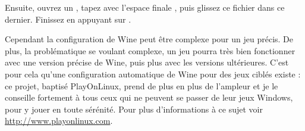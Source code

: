 Ensuite, ouvrez un , tapez avec l'espace finale , puis glissez ce fichier dans ce dernier. Finissez en appuyant sur .\par
\begin{nota}
Cependant la configuration de Wine peut être complexe pour un jeu précis. De plus, la problématique se voulant complexe, un jeu pourra très bien fonctionner avec une version précise de Wine, puis plus avec les versions ultérieures. C'est pour cela qu'une configuration automatique de Wine pour des jeux ciblés existe : ce projet, baptisé PlayOnLinux, prend de plus en plus de l'ampleur et je le conseille fortement à tous ceux qui ne peuvent se passer de leur jeux Windows, pour y jouer en toute sérénité. Pour plus d'informations à ce sujet voir \url{http://www.playonlinux.com}.
\end{nota}
